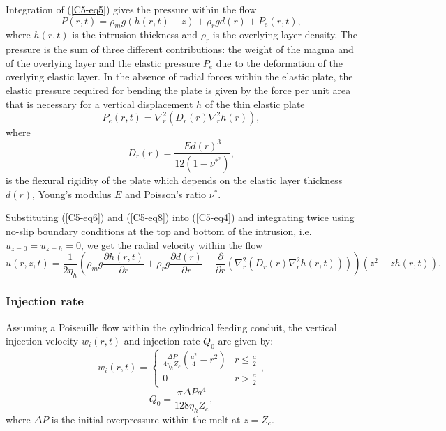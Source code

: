 Integration of (\ref{C5-eq5}) gives the pressure within the flow
\begin{equation}
  P(r,t)=\rho_{m}g(h(r,t)-z) + \rho_rgd(r) + P_{e}(r,t),
  \label{C5-eq6}
\end{equation}
where  $h(r,t)$  is  the  intrusion  thickness  and  $\rho_r$  is  the
overlying layer density.   The pressure is the sum  of three different
contributions: the weight of the magma  and of the overlying layer and
the elastic  pressure $P_e$  due to the  deformation of  the overlying
elastic  layer. In  the absence  of radial  forces within  the elastic
plate, the elastic pressure required for bending the plate is given by
the force per unit area that  is necessary for a vertical displacement
$h$ of the thin elastic plate \citep{Turcotte:1982ca}
\begin{equation}
  P_{e}(r,t)=\nabla^{2}_{r}\left( D_r(r)\nabla^{2}_{r}h(r) \right),
  \label{C5-eq8}	
\end{equation}
where
\begin{equation}
  D_r(r)=\frac{Ed(r)^{3}}{12(1-\nu^*^2)},
  \label{C5-eq8a}
\end{equation}
is the  flexural rigidity of  the plate  which depends on  the elastic
layer thickness  $d(r)$, Young's  modulus $E$ and  Poisson's ratio
$\nu^*$.
	 	
Substituting (\ref{C5-eq6}) and (\ref{C5-eq8}) into (\ref{C5-eq4}) and
integrating twice  using no-slip  boundary conditions  at the  top and
bottom of the  intrusion, i.e. $u_{z=0}=u_{z=h}=0$, we  get the radial
velocity within the flow
\begin{equation}
  u(r,z,t)=        \frac{1}{2\eta_h}\left(\rho_{m}g        \frac{\partial
      h(r,t)}{\partial r} +  \rho_rg \frac{\partial d(r)}{\partial
      r}+\frac{\partial}{\partial                              r}\left
      (         \nabla^{2}_{r}(D_r(r)\nabla^{2}_{r}h(r,t))\right)\right)
  (z^{2}-zh(r,t)).

  \label{C5-eq10}
\end{equation}

\subsubsection{Injection rate}
\label{C5-Injection_Rate}

Assuming a Poiseuille flow within the cylindrical feeding conduit, the
vertical  injection velocity  $w_i(r,t)$  and injection  rate $Q_0$  are
given by:
\begin{equation*}
  w_i(r,t)=
  \begin{cases}
    \frac{ \Delta P}{4 \eta_h Z_{c}} (\frac{a^{2}}{4}-r^{2})& r \le \frac{a}{2}\\
    0 & r > \frac{a}{2}
  \end{cases},
  \label{C5-eq12}
\end{equation*}
\begin{equation}
  Q_{0}=\frac{\pi \Delta P a^{4}}{128 \eta_h Z_c},
  \label{C5-eq11}
\end{equation}
where  $\Delta P$  is  the  initial overpressure  within  the melt  at
$z=Z_{c}$.

